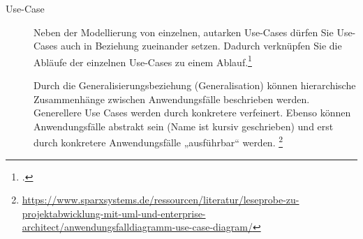 \documentclass{lehramt-informatik-haupt}
\begin{document}
\begin{description}

%

\item[Use-Case]

\begin{center}
\end{center}

Neben der Modellierung von einzelnen, autarken Use-Cases dürfen Sie
Use-Cases auch in Beziehung zueinander setzen. Dadurch verknüpfen Sie
die Abläufe der einzelnen Use-Cases zu einem Ablauf.\footcite[Seite 248]{rupp}

Durch die Generalisierungsbeziehung (Generalisation) können
hierarchische Zusammenhänge zwischen Anwendungsfälle beschrieben werden.
Generellere Use Cases werden durch konkretere verfeinert. Ebenso können
Anwendungsfälle abstrakt sein (Name ist kursiv geschrieben) und erst
durch konkretere Anwendungsfälle „ausführbar“ werden.
\footnote{\url{https://www.sparxsystems.de/ressourcen/literatur/leseprobe-zu-projektabwicklung-mit-uml-und-enterprise-architect/anwendungsfalldiagramm-use-case-diagram/}}

\begin{center}
\end{center}

%


\end{description}
\end{document}
